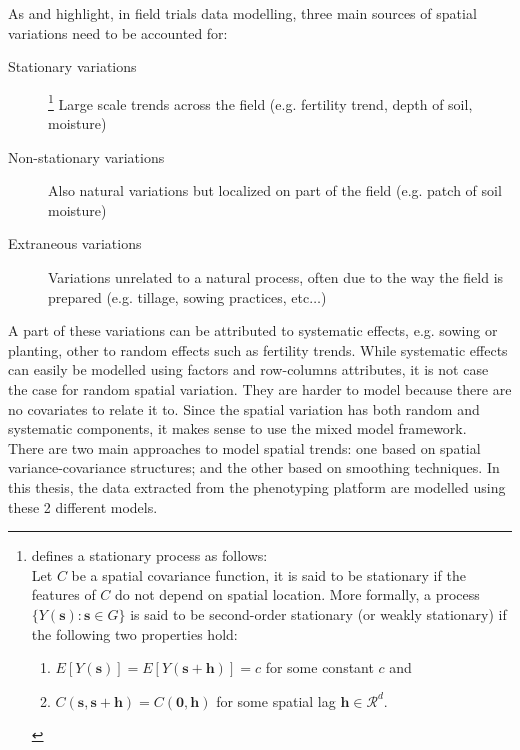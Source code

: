 As \textcite{wilkinson1983nearest} and \textcite{gilmour_accounting_1997} highlight, in field trials data modelling, three main sources of spatial variations need to be accounted for:
\begin{description}
    \item[Stationary variations] 
    	\footnote{\textcite{risser2016nonstationary} defines a stationary process as follows:\\
	    Let $C$ be a spatial covariance function, it is said to be stationary if the features of $C$ do not depend on spatial 
	    location. More formally, a process $\{Y(\mathbf{s}) : \mathbf{s} \in G\}$ is said to be second-order stationary (or 
	    weakly 
	    stationary) if the following two properties hold:
		    \begin{enumerate}
		        \item $E[Y(\mathbf{s})]=E[Y(\mathbf{s}+\mathbf{h})]=c$ for some constant $c$ and 
		        \item $C(\mathbf{s}, \mathbf{s}+\mathbf{h})=C(\mathbf{0}, \mathbf{h})$
		        for some spatial lag $\mathbf{h} \in \mathcal{R}^{d}$.
		    \end{enumerate}
	    }
    Large scale trends across the field (e.g. fertility trend, depth of soil, moisture)
    \item[Non-stationary variations] Also natural variations but localized on part of the field (e.g. patch of soil moisture)
    \item[Extraneous variations] Variations unrelated to a natural process, often due to the way the field is prepared (e.g. 
    tillage, sowing practices, etc$\ldots$)
\end{description}
A part of these variations can be attributed to systematic effects, e.g. sowing or planting, other to random effects such as fertility trends. While systematic effects can easily be modelled using factors and row-columns attributes, it is not case the case for random spatial variation. They are harder to model because there are no covariates to relate it to. Since the spatial variation has both random and systematic components, it makes sense to use the mixed model framework.\\
There are two main approaches to model spatial trends: one based on spatial variance-covariance structures; and the other based on smoothing techniques. In this thesis, the data extracted from the phenotyping platform are modelled using these 2 different models.

